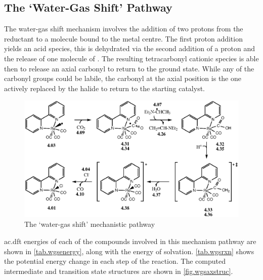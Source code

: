\FloatBarrier

\subsection{The `Water-Gas Shift' Pathway}\label{ss.watergas}
The water-gas shift mechanism involves the addition of two protons from the reductant to a  molecule bound to the metal centre. The first proton addition yields an acid species, this is dehydrated via the second addition of a proton and the release of one molecule of . The resulting tetracarbonyl cationic species is able then to release an axial carbonyl to return to the ground state. While any of the carbonyl groups could be labile, the carbonyl at the axial position is the one actively replaced by the halide to return to the starting catalyst\autocite{shaver1992}. 

\begin{figure}[!htb]
 \begin{center}
  \includegraphics[clip=true, width=\textwidth, keepaspectratio]{images/watergas.eps}
 \end{center}
\caption{The `water-gas shift' mechanistic pathway}
\label{fig.watergas}
\end{figure} 

\Gls{ac.dft} energies of each of the compounds involved in this mechanism pathway are shown in \autoref{tab.wgsenergy}, along with the energy of solvation. \autoref{tab.wgsrxn} shows the potential energy change in each step of the reaction. The computed intermediate and transition state structures are shown in \autoref{fig.wgsaxstruc}.




